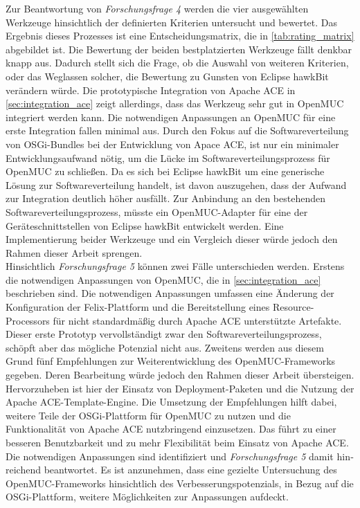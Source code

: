 Zur Beantwortung von \textit{Forschungsfrage 4} werden die vier ausgewählten Werkzeuge hinsichtlich der definierten Kriterien untersucht und bewertet.
Das Ergebnis dieses Prozesses ist eine Entscheidungsmatrix, die in \autoref{tab:rating_matrix} abgebildet ist.
Die Bewertung der beiden best­plat­zierten Werkzeuge fällt denkbar knapp aus.
Dadurch stellt sich die Frage, ob die Auswahl von weiteren Kriterien, oder das Weglassen solcher, die Bewertung zu Gunsten von Eclipse hawkBit verändern würde.
Die prototypische Integration von Apache ACE in \autoref{sec:integration_ace} zeigt allerdings, dass das Werkzeug sehr gut in OpenMUC integriert werden kann.
Die notwendigen Anpassungen an OpenMUC für eine erste Integration fallen minimal aus.
Durch den Fokus auf die Softwareverteilung von \ac{OSGi}-Bundles bei der Entwicklung von Apace ACE, ist nur ein minimaler Entwicklungsaufwand nötig, um die Lücke 
im Softwareverteilungsprozess für OpenMUC zu schließen.
Da es sich bei Eclipse hawkBit um eine generische Lösung zur Softwareverteilung handelt, ist davon auszugehen, dass der Aufwand zur Integration deutlich höher ausfällt. 
Zur Anbindung an den bestehenden Softwareverteilungsprozess, müsste ein OpenMUC-Adapter für eine der Geräteschnittstellen
von Eclipse hawkBit entwickelt werden.
Eine Implementierung beider Werkzeuge und ein Vergleich dieser würde jedoch den Rahmen dieser Arbeit sprengen.\\

Hinsichtlich \textit{Forschungsfrage 5} können zwei Fälle unterschieden werden. 
Erstens die notwendigen Anpassungen von OpenMUC, die in \autoref{sec:integration_ace} beschrieben sind.
Die notwendigen Anpassungen umfassen eine Änderung der Konfiguration der Felix-Plattform und
die Bereitstellung eines Resource-Processors für nicht standardmäßig durch Apache ACE unterstützte Artefakte.
Dieser erste Prototyp vervollständigt zwar den Softwareverteilungsprozess, schöpft aber das mögliche Potenzial nicht aus.
Zweitens werden aus diesem Grund fünf Empfehlungen zur Weiterentwicklung des OpenMUC-Frameworks gegeben.
Deren Bearbeitung würde jedoch den Rahmen dieser Arbeit übersteigen.
Hervorzuheben ist hier der Einsatz von Deployment-Paketen und die Nutzung der Apache ACE-Template-Engine.
Die Umsetzung der Empfehlungen hilft dabei, weitere Teile der \ac{OSGi}-Plattform für OpenMUC zu nutzen
und die Funktionalität von Apache ACE nutzbringend einzusetzen.
Das führt zu einer besseren Benutzbarkeit und zu mehr Flexibilität beim Einsatz von Apache ACE.
Die notwendigen Anpassungen sind identifiziert und \textit{Forschungsfrage 5} damit hin­rei­chend
beantwortet. 
Es ist anzunehmen, dass eine gezielte Untersuchung des OpenMUC-Frameworks hinsichtlich des 
Verbesserungspotenzials, in Bezug auf die \ac{OSGi}-Plattform, weitere Möglichkeiten zur Anpassungen aufdeckt.\\

